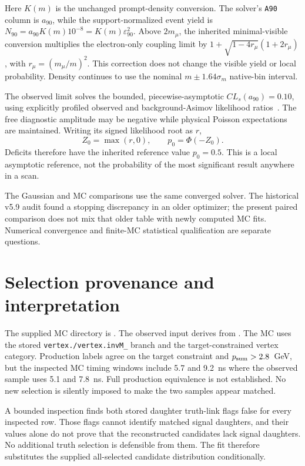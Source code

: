 \documentclass[11pt]{article}
\newcommand{\eps}{\varepsilon}
\begin{document}
Here $K(m)$ is the unchanged prompt-density conversion. The solver's
\texttt{A90} column is $a_{90}$, while the support-normalized event yield
is $N_{90}=a_{90}K(m)10^{-8}=K(m)\eps^2_{90}$. Above $2m_\mu$, the inherited
minimal-visible conversion multiplies the electron-only coupling limit
by $1+\sqrt{1-4r_\mu}(1+2r_\mu)$, with
$r_\mu=(m_\mu/m)^2$. This correction does not change the visible yield
or local probability. Density continues to use the nominal
$m\pm1.64\sigma_m$ native-bin interval.

The observed limit solves the bounded, piecewise-asymptotic
$CL_s(a_{90})=0.10$, using explicitly profiled observed and
background-Asimov likelihood ratios~\cite{Cowan}. The free diagnostic
amplitude may be negative while physical Poisson expectations are
maintained. Writing its signed likelihood root as $r$,
\begin{equation}
 Z_0=\max(r,0),\qquad p_0=\Phi(-Z_0).
\end{equation}
Deficits therefore have the inherited reference value $p_0=0.5$.
This is a local asymptotic reference, not the probability of the most
significant result anywhere in a scan.

The Gaussian and MC comparisons use the same converged solver. The
historical v5.9 audit found a stopping discrepancy in an older optimizer;
the present paired comparison does not mix that older table with newly
computed MC fits. Numerical convergence and finite-MC statistical
qualification are separate questions.

\clearpage
\section{Selection provenance and interpretation}
The supplied MC directory is
.
The observed input derives from
.
The MC uses the stored \texttt{vertex./vertex.invM\_} branch and the
target-constrained vertex category. Production labels agree on the
target constraint and $p_{\rm sum}>2.8$~GeV, but the inspected MC timing
windows include 5.7 and 9.2~ns where the observed sample uses 5.1 and
7.8~ns. Full production equivalence is not established. No new selection
is silently imposed to make the two samples appear matched.

A bounded inspection finds both stored daughter truth-link flags false
for every inspected row. Those flags cannot identify matched signal
daughters, and their values alone do not prove that the reconstructed
candidates lack signal daughters. No additional truth selection is
defensible from them. The fit therefore substitutes the supplied
all-selected candidate distribution conditionally.
\end{document}
